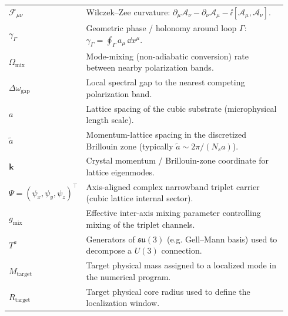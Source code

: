 \begin{center}
\begin{tabular}{p{0.22\linewidth} p{0.72\linewidth}}
$\mathcal{F}_{\mu\nu}$ & Wilczek--Zee curvature: $\partial_\mu\mathcal{A}_\nu-\partial_\nu\mathcal{A}_\mu-\ii[\mathcal{A}_\mu,\mathcal{A}_\nu]$.\\
$\gamma_\Gamma$ & Geometric phase / holonomy around loop $\Gamma$: $\gamma_\Gamma=\oint_\Gamma a_\mu\,\dd x^\mu$.\\
$\Omega_{\mathrm{mix}}$ & Mode-mixing (non-adiabatic conversion) rate between nearby polarization bands.\\
$\Delta\omega_{\mathrm{gap}}$ & Local spectral gap to the nearest competing polarization band.\\
$a$ & Lattice spacing of the cubic substrate (microphysical length scale).\\
$\tilde a$ & Momentum-lattice spacing in the discretized Brillouin zone (typically $\tilde a\sim 2\pi/(N_sa)$).\\
$\mathbf{k}$ & Crystal momentum / Brillouin-zone coordinate for lattice eigenmodes.\\
$\Psi=(\psi_x,\psi_y,\psi_z)^\top$ & Axis-aligned complex narrowband triplet carrier (cubic lattice internal sector).\\
$g_{\mathrm{mix}}$ & Effective inter-axis mixing parameter controlling mixing of the triplet channels.\\
$T^a$ & Generators of $\mathfrak{su}(3)$ (e.g. Gell--Mann basis) used to decompose a $U(3)$ connection.\\
$M_{\mathrm{target}}$ & Target physical mass assigned to a localized mode in the numerical program.\\
$R_{\mathrm{target}}$ & Target physical core radius used to define the localization window.\\
\end{tabular}
\end{center}
